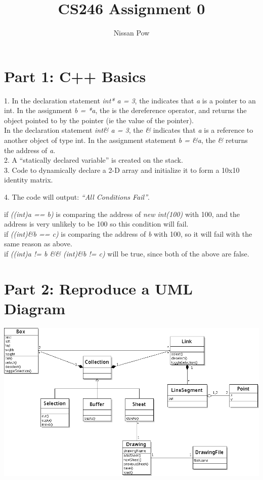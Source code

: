 \documentclass{article}[12pt]
\title{CS246 Assignment 0}
\author{Nissan Pow}
\begin{document}
\maketitle

\section*{Part 1: C++ Basics}

1. In the declaration statement {\em int* a = 3}, the {\em *} indicates that {\em a} is a pointer to an int. In the assignment {\em b = *a}, the {\em *} is the dereference operator, and returns the object pointed to by the pointer (ie the value of the pointer). \\

In the declaration statement {\em int\& a = 3}, the {\em \&} indicates that {\em a} is a reference to another object of type int. In the assignment statement {\em b = \&a}, the {\em \&} returns the address of {\em a}.\\

2. A ``statically declared variable'' is created on the stack. \\

3. Code to dynamically declare a 2-D array and initialize it to form a 10x10 identity matrix.



4. The code will output: {\em ``All Conditions Fail''}.

if {\em ((int)a == b)} is comparing the address of {\em new int(100)} with 100, and the address is very unlikely to be 100 so this condition will fail. \\

if {\em ((int)\&b == c)} is comparing the address of {\em b} with 100, so it will fail with the same reason as above. \\

if {\em ((int)a != b \&\& (int)\&b != c)} will be true, since both of the above are false. \\

\section*{Part 2: Reproduce a UML Diagram}

\includegraphics[scale=0.45]{cs246_a0.png}
\end{document}
